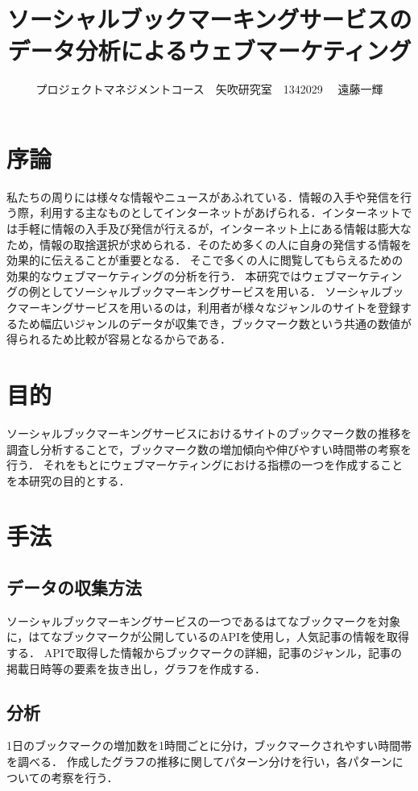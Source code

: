\documentclass[uplatex,twocolumn,dvipdfmx]{jsarticle}
\title{\vspace{-5mm}\fontsize{14pt}{0pt}\selectfont ソーシャルブックマーキングサービスのデータ分析によるウェブマーケティング}
\author{\normalsize プロジェクトマネジメントコース　矢吹研究室　1342029 　遠藤一輝}
\date{}
\begin{document}
\fontsize{10.5pt}{\baselineskip}\selectfont
\maketitle





\section{序論}
私たちの周りには様々な情報やニュースがあふれている．情報の入手や発信を行う際，利用する主なものとしてインターネットがあげられる．インターネットでは手軽に情報の入手及び発信が行えるが，インターネット上にある情報は膨大なため，情報の取捨選択が求められる．そのため多くの人に自身の発信する情報を効果的に伝えることが重要となる．
そこで多くの人に閲覧してもらえるための効果的なウェブマーケティングの分析を行う．
本研究ではウェブマーケティングの例としてソーシャルブックマーキングサービスを用いる．
ソーシャルブックマーキングサービスを用いるのは，利用者が様々なジャンルのサイトを登録するため幅広いジャンルのデータが収集でき，ブックマーク数という共通の数値が得られるため比較が容易となるからである．

\section{目的}
ソーシャルブックマーキングサービスにおけるサイトのブックマーク数の推移を調査し分析することで，ブックマーク数の増加傾向や伸びやすい時間帯の考察を行う．
それをもとにウェブマーケティングにおける指標の一つを作成することを本研究の目的とする．


\section{手法}

\subsection{データの収集方法}
ソーシャルブックマーキングサービスの一つであるはてなブックマークを対象に，はてなブックマークが公開しているのAPI\cite{hatena}を使用し，人気記事の情報を取得する．
APIで取得した情報からブックマークの詳細，記事のジャンル，記事の掲載日時等の要素を抜き出し，グラフを作成する．

\subsection{分析}
1日のブックマークの増加数を1時間ごとに分け，ブックマークされやすい時間帯を調べる．
作成したグラフの推移に関してパターン分けを行い，各パターンについての考察を行う．
\end{document}
